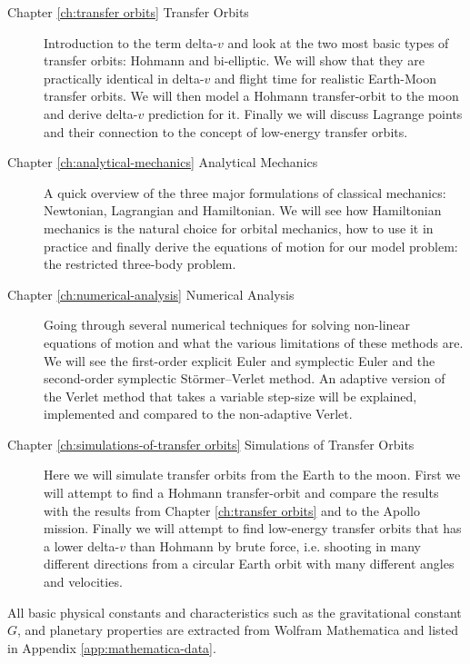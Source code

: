 \begin{description}
    \item[Chapter \ref{ch:transfer orbits} Transfer Orbits] Introduction to the term delta-$v$ and look at the two most basic types of transfer orbits: Hohmann and bi-elliptic. We will show that they are practically identical in delta-$v$ and flight time for realistic Earth-Moon transfer orbits. We will then model a Hohmann transfer-orbit to the moon and derive delta-$v$ prediction for it. Finally we will discuss Lagrange points and their connection to the concept of low-energy transfer orbits.
    \item[Chapter \ref{ch:analytical-mechanics} Analytical Mechanics] A quick overview of the three major formulations of classical mechanics: Newtonian, Lagrangian and Hamiltonian. We will see how Hamiltonian mechanics is the natural choice for orbital mechanics, how to use it in practice and finally derive the equations of motion for our model problem: the restricted three-body problem.
    \item[Chapter \ref{ch:numerical-analysis} Numerical Analysis] Going through several numerical techniques for solving non-linear equations of motion and what the various limitations of these methods are. We will see the first-order explicit Euler and symplectic Euler and the second-order symplectic Störmer–Verlet method. An adaptive version of the Verlet method that takes a variable step-size will be explained, implemented and compared to the non-adaptive Verlet.
    \item[Chapter \ref{ch:simulations-of-transfer orbits} Simulations of Transfer Orbits] Here we will simulate transfer orbits from the Earth to the moon. First we will attempt to find a Hohmann transfer-orbit and compare the results with the results from Chapter \ref{ch:transfer orbits} and to the Apollo mission. Finally we will attempt to find low-energy transfer orbits that has a lower delta-$v$ than Hohmann by brute force, i.e. shooting in many different directions from a circular Earth orbit with many different angles and velocities.
\end{description}

All basic physical constants and characteristics such as the gravitational constant $G$, and planetary properties are extracted from Wolfram Mathematica \cite{ma} and listed in Appendix \ref{app:mathematica-data}.
